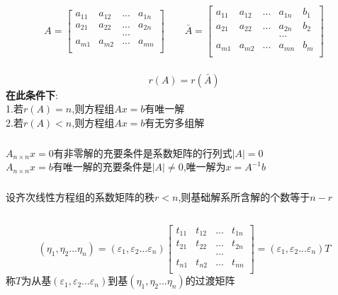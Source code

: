 \documentclass[11pt, a4paper, UTF8]{ctexart}
\begin{document}
\subsection{}
\subsubsection{}
\[
A=\begin{bmatrix}
a_{11}&a_{12}&...&a_{1n}\\
a_{21}&a_{22}&...&a_{2n}\\
&&...&\\
a_{m1}&a_{m2}&...&a_{mn}\\
\end{bmatrix}
\qquad\bar A=\begin{bmatrix}
a_{11}&a_{12}&...&a_{1n}&b_1\\
a_{21}&a_{22}&...&a_{2n}&b_2\\
&&&...&\\
a_{m1}&a_{m2}&...&a_{mn}&b_m\\
\end{bmatrix}\]
\subsubsection{}
\[r(A)=r(\bar A)\]
\textbf{在此条件下}:\\
1.若$r(A)=n$,则方程组$Ax=b$有唯一解\\
2.若$r(A)<n$,则方程组$Ax=b$有无穷多组解
\subsubsection{}
$A_{n\times n}x=0$有非零解的充要条件是系数矩阵的行列式$|A|=0$\\
$A_{n\times n}x=b$有唯一解的充要条件是$|A|\not=0$,唯一解为$x=A^{-1}b$
\subsubsection{}
设齐次线性方程组的系数矩阵的秩$r<n$,则基础解系所含解的个数等于$n-r$
\subsection{}
\[(\eta_1,\eta_2...\eta_n)=(\varepsilon_1,\varepsilon_2...\varepsilon_n)\begin{bmatrix}
t_{11}&t_{12}&...&t_{1n}\\
t_{21}&t_{22}&...&t_{2n}\\
&&...&\\
t_{n1}&t_{n2}&...&t_{nn}\\
\end{bmatrix}=(\varepsilon_1,\varepsilon_2...\varepsilon_n)T\]
称$T$为从基$(\varepsilon_1,\varepsilon_2...\varepsilon_n)$到基$(\eta_1,\eta_2...\eta_n)$的过渡矩阵\\
\end{document}
